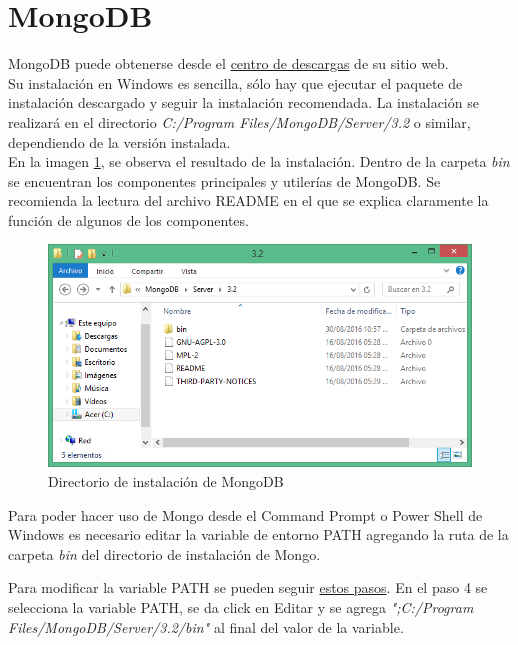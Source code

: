 \documentclass[10pt,a4paper]{report}
\begin{document}
\section{MongoDB}

MongoDB puede obtenerse desde el \href{https://www.mongodb.com/download-center}{centro de descargas} de su sitio web.\\

Su instalación en Windows es sencilla, sólo hay que ejecutar el paquete de instalación descargado y seguir la instalación recomendada. La instalación se realizará en el directorio \textit{C:/Program Files/MongoDB/Server/3.2} o similar, dependiendo de la versión instalada.\\

En la imagen \ref{fig:mongo-directory}, se observa el resultado de la instalación. Dentro de la carpeta \textit{bin} se encuentran los componentes principales y utilerías de MongoDB. Se recomienda la lectura del archivo README en el que se explica claramente la función de algunos de los componentes. 

\begin{figure}[H]
	\centering
	\includegraphics[scale=0.65]{images/mongo-installation-directory}
	\caption{Directorio de instalación de MongoDB}\label{fig:mongo-directory}
\end{figure}

Para poder hacer uso de Mongo desde el Command Prompt o Power Shell de Windows es necesario editar la variable de entorno PATH agregando la ruta de la carpeta \textit{bin} del directorio de instalación de Mongo.

Para modificar la variable PATH se pueden seguir \href{https://support.microsoft.com/en-us/kb/310519}{estos pasos}. En el paso 4 se selecciona la variable PATH, se da click en Editar y se agrega \textit{";C:/Program Files/MongoDB/Server/3.2/bin"} al final del valor de la variable.\\
\end{document}
